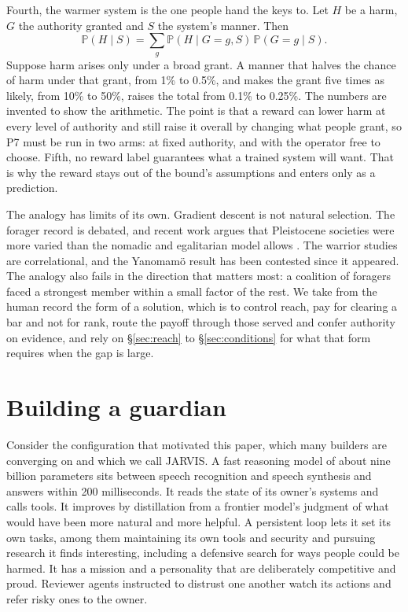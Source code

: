 \documentclass[10pt,twocolumn,letterpaper]{article}
\theoremstyle{definition}
\newcommand{\Pb}{\mathbb{P}}
\begin{document}
Fourth, the warmer system is the one people hand the keys to. Let $H$ be a harm, $G$ the authority granted and $S$ the system's manner. Then
\[
\Pb(H\mid S)=\sum_{g}\Pb(H\mid G=g,S)\,\Pb(G=g\mid S).
\]
Suppose harm arises only under a broad grant. A manner that halves the chance of harm under that grant, from 1\% to 0.5\%, and makes the grant five times as likely, from 10\% to 50\%, raises the total from 0.1\% to 0.25\%. The numbers are invented to show the arithmetic. The point is that a reward can lower harm at every level of authority and still raise it overall by changing what people grant, so P7 must be run in two arms: at fixed authority, and with the operator free to choose. Fifth, no reward label guarantees what a trained system will want. That is why the reward stays out of the bound's assumptions and enters only as a prediction.

The analogy has limits of its own. Gradient descent is not natural selection. The forager record is debated, and recent work argues that Pleistocene societies were more varied than the nomadic and egalitarian model allows \cite{singh}. The warrior studies are correlational, and the Yanomam\"o result has been contested since it appeared. The analogy also fails in the direction that matters most: a coalition of foragers faced a strongest member within a small factor of the rest. We take from the human record the form of a solution, which is to control reach, pay for clearing a bar and not for rank, route the payoff through those served and confer authority on evidence, and rely on \S\ref{sec:reach} to \S\ref{sec:conditions} for what that form requires when the gap is large.

\section{Building a guardian}
\label{sec:guardian}

Consider the configuration that motivated this paper, which many builders are converging on and which we call JARVIS. A fast reasoning model of about nine billion parameters sits between speech recognition and speech synthesis and answers within 200 milliseconds. It reads the state of its owner's systems and calls tools. It improves by distillation from a frontier model's judgment of what would have been more natural and more helpful. A persistent loop lets it set its own tasks, among them maintaining its own tools and security and pursuing research it finds interesting, including a defensive search for ways people could be harmed. It has a mission and a personality that are deliberately competitive and proud. Reviewer agents instructed to distrust one another watch its actions and refer risky ones to the owner.
\end{document}
